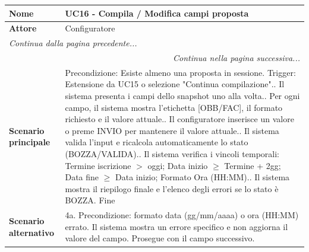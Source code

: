 \documentclass[12pt, a4paper, oneside]{report}
\begin{document}
\begin{tabularx}{\textwidth}{|l|X|}
    \hline
    \textbf{Nome}               & \textbf{UC16 - Compila / Modifica campi proposta} \\ \hline
    \textbf{Attore}             & Configuratore \\ \hline
    \endfirsthead 

    \hline
    \multicolumn{2}{|l|}{\textit{Continua dalla pagina precedente...}} \\ \hline
    \endhead 

    \hline
    \multicolumn{2}{|r|}{\textit{Continua nella pagina successiva...}} \\ \hline
    \endfoot 

    \hline
    \endlastfoot

    \textbf{Scenario principale} & 
    Precondizione: Esiste almeno una proposta in sessione.\newline
    Trigger: Estensione da UC15 o selezione "Continua compilazione".\newline
    1. Il sistema presenta i campi dello snapshot uno alla volta.\newline
    2. Per ogni campo, il sistema mostra l'etichetta [OBB/FAC], il formato richiesto e il valore attuale.\newline
    3. Il configuratore inserisce un valore o preme INVIO per mantenere il valore attuale.\newline
    4. Il sistema valida l'input e ricalcola automaticamente lo stato (BOZZA/VALIDA).\newline
    5. Il sistema verifica i vincoli temporali: Termine iscrizione $>$ oggi; Data inizio $\ge$ Termine + 2gg; Data fine $\ge$ Data inizio; Formato Ora (HH:MM).\newline
    6. Il sistema mostra il riepilogo finale e l'elenco degli errori se lo stato è BOZZA.\newline
    Fine \\ \hline
    
    \textbf{Scenario alternativo} & 
    4a. Precondizione: formato data (gg/mm/aaaa) o ora (HH:MM) errato.\newline
    Il sistema mostra un errore specifico e non aggiorna il valore del campo. Prosegue con il campo successivo. \\ \hline
\end{tabularx}
\end{document}
